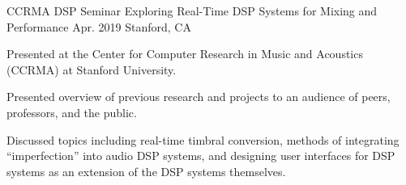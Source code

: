 \begin{cventries}
    \cventry
    {CCRMA DSP Seminar} %
    {Exploring Real-Time DSP Systems for Mixing and Performance} %
    {Apr. 2019} %
    {Stanford, CA} %
    {
      \begin{cvitems} %
        \item {Presented at the Center for Computer Research in Music and Acoustics (CCRMA) at Stanford University.}
        \item {Presented overview of previous research and projects to an audience of peers, professors, and the public.}
        \item {Discussed topics including real-time timbral conversion, methods of integrating ``imperfection'' into audio
               DSP systems, and designing user interfaces for DSP systems as an extension of the DSP systems themselves.}
      \end{cvitems}
    }


\end{cventries}
